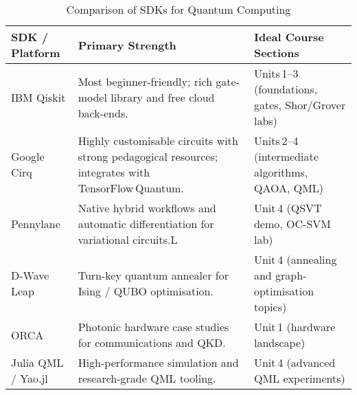\begin{table}[ht]
	\centering
	\begin{tabular}{|p{2.8cm}|p{7cm}|p{4cm}|}
		\hline
		\textbf{SDK / Platform} & \textbf{Primary Strength} & \textbf{Ideal Course Sections} \\
		\hline
		IBM Qiskit & Most beginner-friendly; rich gate-model library and free cloud back-ends. & Units 1–3 (foundations, gates, Shor/Grover labs) \\
		\hline
		Google Cirq & Highly customisable circuits with strong pedagogical resources; integrates with TensorFlow Quantum. & Units 2–4 (intermediate algorithms, QAOA, QML) \\
		\hline
		Pennylane & Native hybrid workflows and automatic differentiation for variational circuits.L & Unit 4 (QSVT demo, OC-SVM lab) \\
		\hline
		D-Wave Leap & Turn-key quantum annealer for Ising / QUBO optimisation. & Unit 4 (annealing and graph-optimisation topics) \\
		\hline
		ORCA  & Photonic hardware case studies for communications and QKD. & Unit 1 (hardware landscape) \\
		\hline
		Julia QML / Yao.jl & High-performance simulation and research-grade QML tooling. & Unit 4 (advanced QML experiments) \\
		\hline
	\end{tabular}
	\caption{Comparison of SDKs for Quantum Computing}
	\label{tab:quantum_sdk_comparison}
\end{table}
